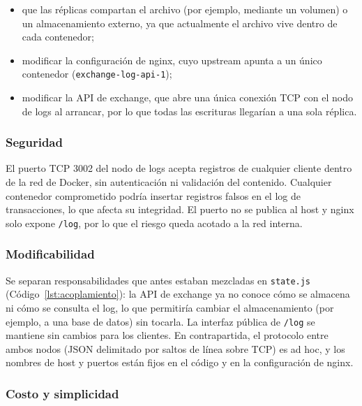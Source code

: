         \begin{itemize}
            \item que las réplicas compartan el archivo (por ejemplo, mediante un volumen) o un almacenamiento externo, ya que
            actualmente el archivo vive dentro de cada contenedor;
            \item modificar la configuración de nginx, cuyo upstream apunta a un único contenedor (\texttt{exchange-log-api-1});
            \item modificar la API de exchange, que abre una única conexión TCP con el nodo de logs al arrancar, por lo que
            todas las escrituras llegarían a una sola réplica.
        \end{itemize}

        \subsubsection{Seguridad}
        \label{sec:propuesta_1_seguridad}

        El puerto TCP 3002 del nodo de logs acepta registros de cualquier cliente dentro de la red de Docker, sin autenticación
        ni validación del contenido. Cualquier contenedor comprometido podría insertar registros falsos en el log de
        transacciones, lo que afecta su integridad. El puerto no se publica al host y nginx solo expone \texttt{/log}, por
        lo que el riesgo queda acotado a la red interna.

        \subsubsection{Modificabilidad}
        \label{sec:propuesta_1_modificabilidad}

        Se separan responsabilidades que antes estaban mezcladas en \texttt{state.js} (Código~\ref{lst:acoplamiento}): la API de exchange ya no conoce cómo se
        almacena ni cómo se consulta el log, lo que permitiría cambiar el almacenamiento (por ejemplo, a una base de datos) sin
        tocarla. La interfaz pública de \texttt{/log} se mantiene sin cambios para los clientes. En contrapartida, el protocolo
        entre ambos nodos (JSON delimitado por saltos de línea sobre TCP) es ad hoc, y los nombres de host y puertos están
        fijos en el código y en la configuración de nginx.

        \subsubsection{Costo y simplicidad}
        \label{sec:propuesta_1_costo_y_simplicidad}

